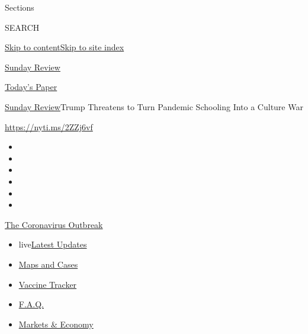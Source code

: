 Sections

SEARCH

\protect\hyperlink{site-content}{Skip to
content}\protect\hyperlink{site-index}{Skip to site index}

\href{https://www.nytimes.com/section/opinion/sunday}{Sunday Review}

\href{https://myaccount.nytimes.com/auth/login?response_type=cookie\&client_id=vi}{}

\href{https://www.nytimes.com/section/todayspaper}{Today's Paper}

\href{/section/opinion/sunday}{Sunday Review}\textbar{}Trump Threatens
to Turn Pandemic Schooling Into a Culture War

\href{https://nyti.ms/2ZZj6vf}{https://nyti.ms/2ZZj6vf}

\begin{itemize}
\item
\item
\item
\item
\item
\item
\end{itemize}

\href{https://www.nytimes.com/news-event/coronavirus?action=click\&pgtype=Article\&state=default\&region=TOP_BANNER\&context=storylines_menu}{The
Coronavirus Outbreak}

\begin{itemize}
\tightlist
\item
  live\href{https://www.nytimes.com/2020/08/08/world/coronavirus-updates.html?action=click\&pgtype=Article\&state=default\&region=TOP_BANNER\&context=storylines_menu}{Latest
  Updates}
\item
  \href{https://www.nytimes.com/interactive/2020/us/coronavirus-us-cases.html?action=click\&pgtype=Article\&state=default\&region=TOP_BANNER\&context=storylines_menu}{Maps
  and Cases}
\item
  \href{https://www.nytimes.com/interactive/2020/science/coronavirus-vaccine-tracker.html?action=click\&pgtype=Article\&state=default\&region=TOP_BANNER\&context=storylines_menu}{Vaccine
  Tracker}
\item
  \href{https://www.nytimes.com/interactive/2020/world/coronavirus-tips-advice.html?action=click\&pgtype=Article\&state=default\&region=TOP_BANNER\&context=storylines_menu}{F.A.Q.}
\item
  \href{https://www.nytimes.com/live/2020/08/07/business/stock-market-today-coronavirus?action=click\&pgtype=Article\&state=default\&region=TOP_BANNER\&context=storylines_menu}{Markets
  \& Economy}
\end{itemize}

